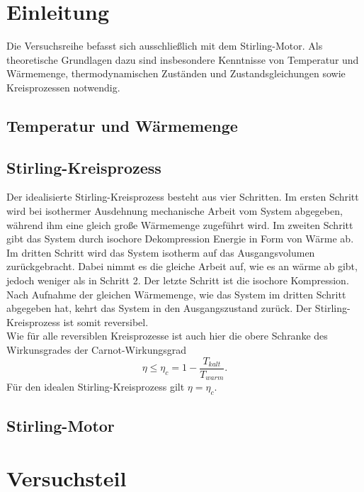 \section{Einleitung}

Die Versuchsreihe befasst sich ausschließlich mit dem Stirling-Motor. Als theoretische Grundlagen dazu sind insbesondere Kenntnisse von Temperatur und Wärmemenge, thermodynamischen Zuständen und Zustandsgleichungen sowie Kreisprozessen notwendig.

\subsection{Temperatur und Wärmemenge} %


\subsection{Stirling-Kreisprozess}
Der idealisierte Stirling-Kreisprozess besteht aus vier Schritten. Im ersten Schritt wird bei isothermer Ausdehnung mechanische Arbeit vom System abgegeben, während ihm eine gleich große Wärmemenge zugeführt wird. Im zweiten Schritt gibt das System durch isochore Dekompression Energie in Form von Wärme ab. Im dritten Schritt wird das System isotherm auf das Ausgangsvolumen zurückgebracht. Dabei nimmt es die gleiche Arbeit auf, wie es an wärme ab gibt, jedoch weniger als in Schritt 2. Der letzte Schritt ist die isochore Kompression. Nach Aufnahme der gleichen Wärmemenge, wie das System im dritten Schritt abgegeben hat, kehrt das System in den Ausgangszustand zurück. Der Stirling-Kreisprozess ist somit reversibel. \\
Wie für alle reversiblen Kreisprozesse ist auch hier die obere Schranke des Wirkunsgrades der Carnot-Wirkungsgrad
\begin{equation}
	\eta \leq \eta_c = 1 - \frac{T_{kalt}}{T_{warm}} \label{eq:carnot}\text{.}
\end{equation}
Für den idealen Stirling-Kreisprozess gilt $ \eta = \eta_c $.

\subsection{Stirling-Motor}

\newpage
\section{Versuchsteil}

